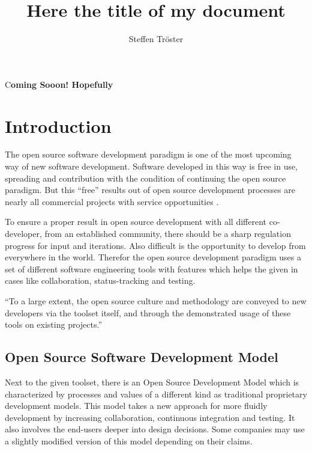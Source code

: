 \documentclass[DIV=calc,paper=a4,fontsize=11pt,twocolumn]{scrartcl}
\title{Here the title of my document}					%
\author{Steffen Tröster \\}											%
\date{}																%
\newcommand{\initial}[1]{%
     \lettrine[lines=3,lhang=0.3,nindent=0em]{
                    \color{headblue}
                    {\textsf{#1}}}{}}
\begin{document}
\maketitle
\thispagestyle{fancy}		%
\initial{C}\textbf{oming Sooon! Hopefully}

\section{Introduction}

The open source software development paradigm is one of the most upcoming way of new software development. Software developed in this way is free in use, spreading and contribution with the condition of continuing the open source paradigm. But this \enquote{free} results out of open source development processes are nearly all commercial projects with service opportunities \citep{Wheeler}.

To ensure a proper result in open source development with all different co-developer, from an established community, there should be a sharp regulation progress for input and iterations. Also difficult is the opportunity to develop from everywhere in the world. Therefor the open source development paradigm uses a set of different software engineering tools with features which helps the given in cases like collaboration, status-tracking and testing.

\enquote{To a large extent, the open source culture and methodology are conveyed to new developers via the toolset itself, and through the demonstrated usage of these tools on existing projects.} \citep{Robbins02adoptingoss}

\subsection{Open Source Software Development Model}

Next to the given toolset, there is an Open Source Development Model which is characterized by processes and values of a different kind as traditional proprietary development models. This model takes a new approach for more fluidly development by increasing collaboration, continuous integration and testing. It also involves the end-users deeper into design decisions. Some companies may use a slightly modified version of this model depending on their claims. \citep{Haddad11}
\end{document}
